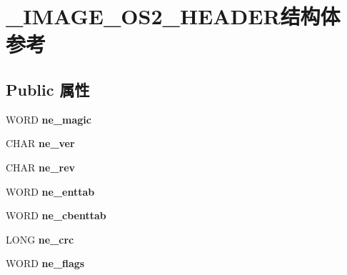 \hypertarget{struct___i_m_a_g_e___o_s2___h_e_a_d_e_r}{}\section{\+\_\+\+I\+M\+A\+G\+E\+\_\+\+O\+S2\+\_\+\+H\+E\+A\+D\+E\+R结构体 参考}
\label{struct___i_m_a_g_e___o_s2___h_e_a_d_e_r}
\subsection*{Public 属性}
\begin{DoxyCompactItemize}
\item 
\mbox{\label{struct___i_m_a_g_e___o_s2___h_e_a_d_e_r_ada25cabc0b108f276aea85122beede25}} 
W\+O\+RD {\bfseries ne\+\_\+magic}
\item 
\mbox{\label{struct___i_m_a_g_e___o_s2___h_e_a_d_e_r_a9341e39dc970cc821cf90defa549bfe9}} 
C\+H\+AR {\bfseries ne\+\_\+ver}
\item 
\mbox{\label{struct___i_m_a_g_e___o_s2___h_e_a_d_e_r_a07da296925ab37d9dcb5e7d8a8bfa5aa}} 
C\+H\+AR {\bfseries ne\+\_\+rev}
\item 
\mbox{\label{struct___i_m_a_g_e___o_s2___h_e_a_d_e_r_a583cd5bd655fae6bbc2d3a60a2c8bbec}} 
W\+O\+RD {\bfseries ne\+\_\+enttab}
\item 
\mbox{\label{struct___i_m_a_g_e___o_s2___h_e_a_d_e_r_a5bca952d2d44b79b068dd4617107dd96}} 
W\+O\+RD {\bfseries ne\+\_\+cbenttab}
\item 
\mbox{\label{struct___i_m_a_g_e___o_s2___h_e_a_d_e_r_ac8de101ef45549bda77c04818dbaff00}} 
L\+O\+NG {\bfseries ne\+\_\+crc}
\item 
\mbox{\label{struct___i_m_a_g_e___o_s2___h_e_a_d_e_r_af048e46e7b83fa6e4c04625e4d7290ff}} 
W\+O\+RD {\bfseries ne\+\_\+flags}
\item 
\mbox{\label{struct___i_m_a_g_e___o_s2___h_e_a_d_e_r_a33af47de129e3fa3f6e94a042100acdc}} 

\end{DoxyCompactItemize}

